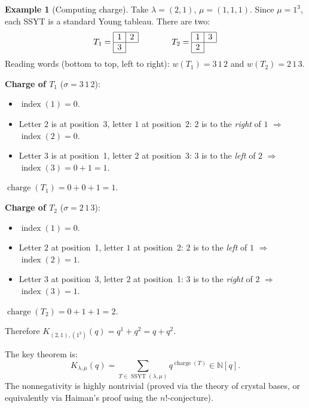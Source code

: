 \documentclass[11pt]{article}
\theoremstyle{plain}
\theoremstyle{definition}
\newtheorem{example}[theorem]{Example}
\theoremstyle{remark}
\newcommand{\N}{\mathbb{N}}
\newcommand{\charge}{\operatorname{charge}}
\newcommand{\SSYT}{\operatorname{SSYT}}
\begin{document}
\begin{example}[Computing charge]\label{ex:charge}
Take $\lambda = (2,1)$, $\mu = (1,1,1)$.
Since $\mu = 1^3$, each SSYT is a standard Young tableau.
There are two:
\[
  T_1 = \begin{array}{|c|c|}\hline 1 & 2 \\\hline 3 \\\cline{1-1}\end{array}
  \qquad\qquad
  T_2 = \begin{array}{|c|c|}\hline 1 & 3 \\\hline 2 \\\cline{1-1}\end{array}
\]
Reading words (bottom to top, left to right):
$w(T_1) = 3\,1\,2$ and $w(T_2) = 2\,1\,3$.

\smallskip\noindent
\textbf{Charge of $T_1$} ($\sigma = 3\,1\,2$):
\begin{itemize}
\item $\operatorname{index}(1) = 0$.
\item Letter $2$ is at position~3, letter $1$ at position~2:
  $2$ is to the \emph{right} of $1$ $\Rightarrow$
  $\operatorname{index}(2) = 0$.
\item Letter $3$ is at position~1, letter $2$ at position~3:
  $3$ is to the \emph{left} of $2$ $\Rightarrow$
  $\operatorname{index}(3) = 0 + 1 = 1$.
\end{itemize}
$\charge(T_1) = 0 + 0 + 1 = 1$.

\smallskip\noindent
\textbf{Charge of $T_2$} ($\sigma = 2\,1\,3$):
\begin{itemize}
\item $\operatorname{index}(1) = 0$.
\item Letter $2$ at position~1, letter $1$ at position~2:
  $2$ is to the \emph{left} of $1$ $\Rightarrow$
  $\operatorname{index}(2) = 1$.
\item Letter $3$ at position~3, letter $2$ at position~1:
  $3$ is to the \emph{right} of $2$ $\Rightarrow$
  $\operatorname{index}(3) = 1$.
\end{itemize}
$\charge(T_2) = 0 + 1 + 1 = 2$.

\smallskip
Therefore $K_{(2,1),(1^3)}(q) = q^1 + q^2 = q + q^2$.
\end{example}

The key theorem is:
\[
  K_{\lambda,\mu}(q) = \sum_{T \in \SSYT(\lambda,\mu)} q^{\charge(T)}
  \in \N[q].
\]
The nonnegativity is highly nontrivial (proved via the theory
of crystal bases, or equivalently via Haiman's proof using
the $n!$-conjecture).
\end{document}
